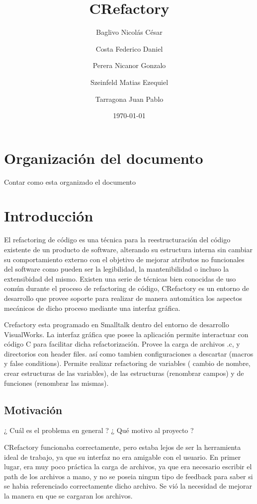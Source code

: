 \documentclass[a4paper,oneside,10pt]{article}
\begin{document}

\title{CRefactory}
\author{Baglivo Nicol\'as C\'esar \and Costa Federico Daniel \and Perera Nicanor Gonzalo \and Szeinfeld Matias Ezequiel \and Tarragona Juan Pablo}
\date{\today}
\maketitle

\tableofcontents

\section{Organizaci\'on del documento}
Contar como esta organizado el documento

\section{Introducción}
El refactoring de c\'odigo es una técnica para la reestructuración del código existente de un producto de software, alterando su estructura interna sin cambiar su comportamiento externo con el objetivo de mejorar atributos no funcionales del software como pueden ser la legibilidad, la mantenibilidad o incluso la extensibidad del mismo. Existen una serie de t\'ecnicas bien conocidas de uso com\'un durante el proceso de refactoring de c\'odigo, CRefactory es un entorno de desarrollo que provee soporte para realizar de manera autom\'atica los aspectos mec\'anicos de dicho proceso mediante una interfaz gr\'afica.

Crefactory esta programado en Smalltalk dentro del entorno de desarrollo VisualWorks. La interfaz gr\'afica que posee la aplicaci\'on permite interactuar con c\'odigo C para facilitar dicha refactorizaci\'on. Provee la carga de archivos .c, y directorios con header files. as\'i como tambien configuraciones a descartar (macros y false conditions).  
Permite realizar refactoring de variables ( cambio de nombre, crear estructuras de las variables), de las estructuras (renombrar campos) y de funciones (renombrar las mismas).


\subsection{Motivaci\'on}
¿ Cu\'al es el problema en general ? ¿ Qu\'e motivo al proyecto ?

CRefactory funcionaba correctamente, pero estaba lejos de ser la herramienta ideal de trabajo, ya que su interfaz no era amigable con el usuario. En primer lugar, era muy poco pr\'actica la carga de archivos, ya que era necesario escribir el path de los archivos a mano, y no se poseia ningun tipo de feedback para saber si se habia referenciado correctamente dicho archivo. Se vi\'o la necesidad de mejorar la manera en que se cargaran los archivos.
\end{document}
